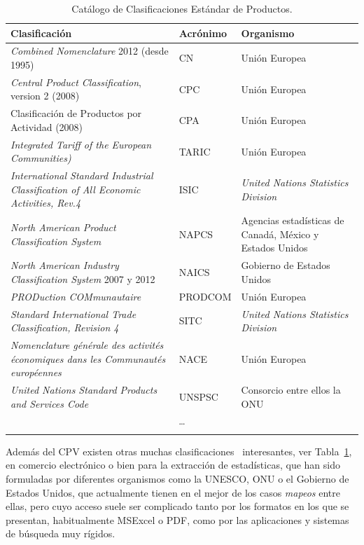\begin{longtable}[c]{|p{6cm}|l|p{6cm}|} 
\hline
  \textbf{Clasificación} &  \textbf{Acrónimo} & \textbf{Organismo} \\\hline
\endhead
\textit{Combined Nomenclature} 2012 (desde 1995) & \gls{CN} & Unión Europea  \\ \hline
\textit{Central Product Classification}, version 2 (2008) & \gls{CPC} & Unión Europea \\ \hline
Clasificación de Productos por Actividad (2008) & \gls{CPA} & Unión Europea \\ \hline
\textit{Integrated Tariff of the European Communities)} & \gls{TARIC} & Unión Europea\\ \hline
\textit{International Standard Industrial Classification of All Economic Activities, Rev.4} & \gls{ISIC} & \textit{United Nations Statistics Division} \\ \hline
\textit{North American Product Classification System} & \gls{NAPCS} & Agencias estadísticas de Canadá, México y Estados Unidos\\ \hline
\textit{North American Industry Classification System} 2007 y 2012 & \gls{NAICS} & Gobierno de Estados Unidos \\ \hline
\textit{PRODuction COMmunautaire} & \gls{PRODCOM} & Unión Europea \\ \hline
\textit{Standard International Trade Classification, Revision 4} & \gls{SITC} & \textit{United Nations Statistics Division} \\ \hline
\textit{Nomenclature générale des activités économiques dans les Communautés européennes} & \gls{NACE} & Unión Europea \\ \hline
\textit{United Nations Standard Products and Services Code} & \gls{UNSPSC} & Consorcio entre ellos la ONU\\ \hline
  \multicolumn{3}{|c|}{\ldots}  \\ \hline
\hline
\caption{Catálogo de Clasificaciones Estándar de Productos.}\label{table:pscs}\\    
\end{longtable}

Además del CPV existen otras muchas clasificaciones~\cite{Norbert-class} interesantes, ver Tabla~\ref{table:pscs}, en comercio electrónico o bien
para la extracción de estadísticas, que han sido formuladas por diferentes organismos como
la \gls{UNESCO}, \gls{ONU} o el Gobierno de Estados Unidos, que actualmente tienen en el mejor de los casos \textit{mapeos} entre ellas, 
pero cuyo acceso suele ser complicado tanto por los formatos en los que se presentan, habitualmente MSExcel o \gls{PDF}, como por 
las aplicaciones y sistemas de búsqueda muy rígidos. 

